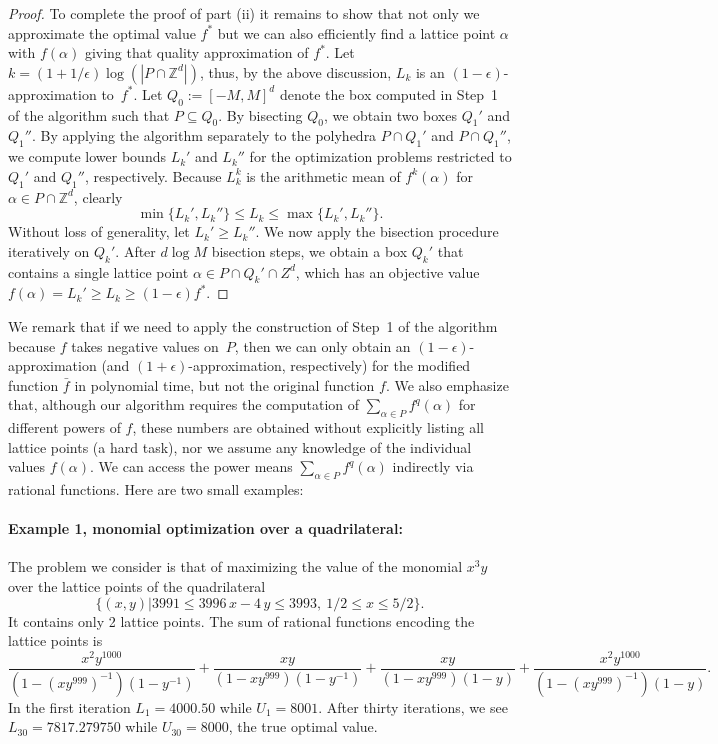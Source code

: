 \documentclass[twoside]{article}
\newcommand{\Z}{\mathbb Z}
\newcommand{\1}{{\bf 1}}
\begin{document}
\begin{proof}
To complete the proof of part (ii) it remains to show that not only
we approximate the optimal value $f^*$ but we can also efficiently
find a lattice point $\alpha$ with $f(\alpha)$ giving that quality
approximation of $f^*$. Let $k = (1+1/\epsilon)\log({|P \cap
  \Z^d|})$, thus, by the above discussion, $L_k$ is an
$(1-\epsilon)$-approximation to~$f^*$.  Let $Q_0 := [-M,M]^d$ denote
the box computed in Step~1 of the algorithm such that $P\subseteq
Q_0$.  By bisecting $Q_0$, we obtain two boxes $Q_1'$ and $Q_1''$.  By
applying the algorithm separately to the polyhedra $P\cap Q_1'$ and
$P\cap Q_1''$, we compute lower bounds $L_k'$ and $L_k''$ for the
optimization problems restricted to $Q_1'$ and $Q_1''$, respectively.
Because $L_k^k$ is the arithmetic mean of $f^k(\alpha)$ for $\alpha\in
P\cap\Z^d$, clearly
\begin{displaymath}
  \min\{L_k', L_k''\} \leq L_k \leq \max\{L_k', L_k''\}.
\end{displaymath}
Without loss of generality, let $L_k'\geq L_k''$.  We now apply the
bisection procedure iteratively on $Q_k'$.  After $d\log M$ bisection
steps, we obtain a box $Q_k'$ that contains a single lattice point
$\alpha\in P\cap Q_k'\cap Z^d$, which has an objective value
$f(\alpha) = L_k' \geq L_k \geq (1-\epsilon) f^*$.
\end{proof}

We remark that if we need to apply the construction of Step~1 of the
algorithm because $f$ takes negative values on~$P$, then we can only
obtain an $(1-\epsilon)$-approximation (and
$(1+\epsilon)$-approximation, respectively) for the modified function
$\bar f$ in polynomial time, but not the original function $f$. We
also emphasize that, although our algorithm requires the computation
of $\sum_{\alpha \in P} f^q(\alpha)$ for different powers of $f$,
these numbers are obtained without explicitly listing all lattice
points (a hard task), nor we assume any knowledge of the individual
values $f(\alpha)$. We can access the power means $\sum_{\alpha \in P}
f^q(\alpha)$ indirectly via rational functions. Here are two small
examples:

\paragraph{Example 1, monomial optimization over a quadrilateral:} 
The problem we consider is that of maximizing the value of the  
monomial $x^3y$ over the lattice points of the quadrilateral
$$
\{(x,y) | 3991 \leq 3996\,x-4\,y \leq 3993, \ 1/2\leq x \leq 5/2\}.
$$
It contains only 2 lattice points. The sum of rational functions
encoding the lattice points is
\[
\frac{{x}^{2}{y}^{1000}}{\left( 1-(xy^{999})^{-1} \right)
 \left( 1-{y}^{-1} \right)}+\frac{xy}{\left( 1-x{y}^{999} \right)
 \left( 1-{y}^{-1} \right)}+
{\frac {xy}{ \left( 1-x{y}^{999}
 \right)  \left( 1-y \right) }}+\frac{{x}^{2}{y}^{1000}}{\left( 1-(xy^{999})^{-1} \right)\left( 1-y \right)}.
\]
In the first iteration $L_1=4000.50$ while $U_1=8001$. After thirty iterations,
we see $L_{30}=7817.279750$ while $U_{30}=8000$, the true optimal value.
\end{document}
